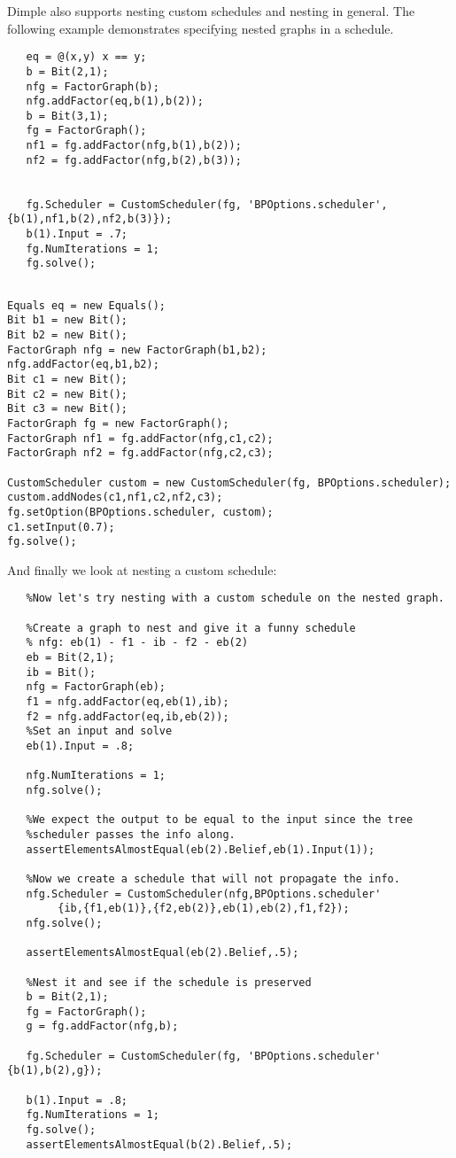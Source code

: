 Dimple also supports nesting custom schedules and nesting in general. The following example demonstrates specifying nested graphs in a schedule.

\ifmatlab

\begin{lstlisting}
   eq = @(x,y) x == y;
   b = Bit(2,1);
   nfg = FactorGraph(b);
   nfg.addFactor(eq,b(1),b(2));
   b = Bit(3,1);
   fg = FactorGraph();
   nf1 = fg.addFactor(nfg,b(1),b(2));
   nf2 = fg.addFactor(nfg,b(2),b(3));
   
   
   fg.Scheduler = CustomScheduler(fg, 'BPOptions.scheduler', {b(1),nf1,b(2),nf2,b(3)});
   b(1).Input = .7;
   fg.NumIterations = 1;
   fg.solve();
\end{lstlisting}

\fi

\ifjava
\begin{lstlisting}

Equals eq = new Equals();
Bit b1 = new Bit();
Bit b2 = new Bit();
FactorGraph nfg = new FactorGraph(b1,b2);
nfg.addFactor(eq,b1,b2);
Bit c1 = new Bit();
Bit c2 = new Bit();
Bit c3 = new Bit();
FactorGraph fg = new FactorGraph();
FactorGraph nf1 = fg.addFactor(nfg,c1,c2);
FactorGraph nf2 = fg.addFactor(nfg,c2,c3);

CustomScheduler custom = new CustomScheduler(fg, BPOptions.scheduler);
custom.addNodes(c1,nf1,c2,nf2,c3);
fg.setOption(BPOptions.scheduler, custom);
c1.setInput(0.7);
fg.solve();
\end{lstlisting}

\fi


And finally we look at nesting a custom schedule:

\ifmatlab

\begin{lstlisting}
   %Now let's try nesting with a custom schedule on the nested graph.
   
   %Create a graph to nest and give it a funny schedule    
   % nfg: eb(1) - f1 - ib - f2 - eb(2)
   eb = Bit(2,1);
   ib = Bit();
   nfg = FactorGraph(eb);
   f1 = nfg.addFactor(eq,eb(1),ib);
   f2 = nfg.addFactor(eq,ib,eb(2));
   %Set an input and solve
   eb(1).Input = .8;
   
   nfg.NumIterations = 1;
   nfg.solve();
   
   %We expect the output to be equal to the input since the tree
   %scheduler passes the info along.
   assertElementsAlmostEqual(eb(2).Belief,eb(1).Input(1));
   
   %Now we create a schedule that will not propagate the info.
   nfg.Scheduler = CustomScheduler(nfg,BPOptions.scheduler'
        {ib,{f1,eb(1)},{f2,eb(2)},eb(1),eb(2),f1,f2});
   nfg.solve();
   
   assertElementsAlmostEqual(eb(2).Belief,.5);

   %Nest it and see if the schedule is preserved
   b = Bit(2,1);
   fg = FactorGraph();
   g = fg.addFactor(nfg,b);
   
   fg.Scheduler = CustomScheduler(fg, 'BPOptions.scheduler' {b(1),b(2),g});
   
   b(1).Input = .8;
   fg.NumIterations = 1;
   fg.solve();
   assertElementsAlmostEqual(b(2).Belief,.5);
\end{lstlisting}

